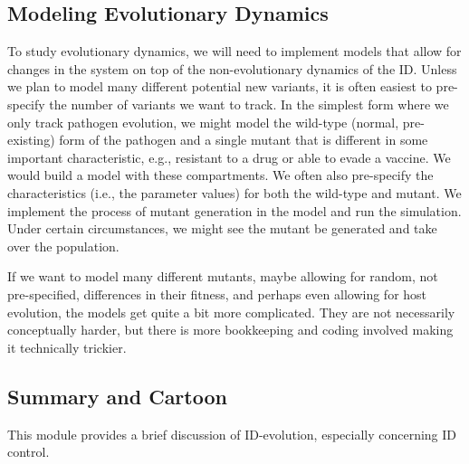 \documentclass[]{article}
\theoremstyle{definition}
\theoremstyle{definition}
\theoremstyle{definition}
\theoremstyle{remark}
\begin{document}
\subsection{Modeling Evolutionary
Dynamics}\label{modeling-evolutionary-dynamics}

To study evolutionary dynamics, we will need to implement models that
allow for changes in the system on top of the non-evolutionary dynamics
of the ID. Unless we plan to model many different potential new
variants, it is often easiest to pre-specify the number of variants we
want to track. In the simplest form where we only track pathogen
evolution, we might model the wild-type (normal, pre-existing) form of
the pathogen and a single mutant that is different in some important
characteristic, e.g., resistant to a drug or able to evade a vaccine. We
would build a model with these compartments. We often also pre-specify
the characteristics (i.e., the parameter values) for both the wild-type
and mutant. We implement the process of mutant generation in the model
and run the simulation. Under certain circumstances, we might see the
mutant be generated and take over the population.

If we want to model many different mutants, maybe allowing for random,
not pre-specified, differences in their fitness, and perhaps even
allowing for host evolution, the models get quite a bit more
complicated. They are not necessarily conceptually harder, but there is
more bookkeeping and coding involved making it technically trickier.

\subsection{Summary and Cartoon}\label{summary-and-cartoon-12}

This module provides a brief discussion of ID-evolution, especially
concerning ID control.
\end{document}
